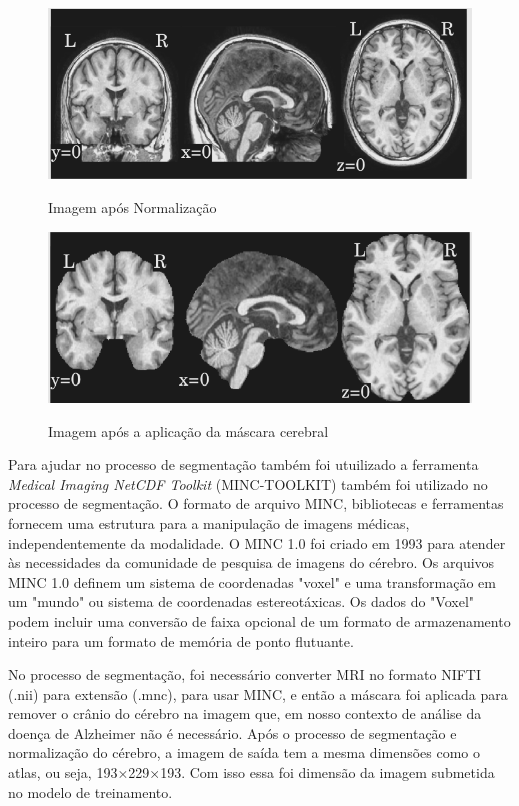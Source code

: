 \documentclass[openright]{UFRGS} %
\begin{document}
\begin{figure}[h]
    \centering
    \caption{Imagem após Normalização}
    \includegraphics[scale=0.40]{MRIG3t1Normalization.png}
    \label{fig:MRIG3t1Normalization}
\end{figure}


\begin{figure}[h]
    \centering
    \caption{Imagem após a aplicação da máscara cerebral}
    \includegraphics[scale=0.40]{MRIG3t1final.png}
    \label{fig:MRIG3t1final}
\end{figure}

Para ajudar no processo de segmentação também foi utuilizado a ferramenta \textit{Medical Imaging NetCDF Toolkit} (MINC-TOOLKIT) também foi utilizado no processo de segmentação. O formato de arquivo MINC, bibliotecas e ferramentas fornecem uma estrutura para a manipulação de imagens médicas, independentemente da modalidade. O MINC 1.0 foi criado em 1993 para atender às necessidades da comunidade de pesquisa de imagens do cérebro. 
Os arquivos MINC 1.0 definem um sistema de coordenadas "voxel" 
e uma transformação em um "mundo" ou sistema de coordenadas estereotáxicas.
Os dados do "Voxel" podem incluir uma conversão de faixa opcional de um formato de
armazenamento inteiro para um formato de memória de ponto flutuante.

No processo de segmentação, foi necessário converter MRI no formato NIFTI (.nii) para extensão (.mnc), para usar MINC,
e então a máscara foi aplicada para remover o crânio do cérebro na 
imagem que, em nosso contexto de análise da doença de Alzheimer não é necessário. Após o processo de segmentação e normalização do cérebro, a imagem de saída tem a mesma dimensões como o atlas, ou seja, 193×229×193.
Com isso essa foi dimensão da imagem submetida no modelo de treinamento.
\end{document}
